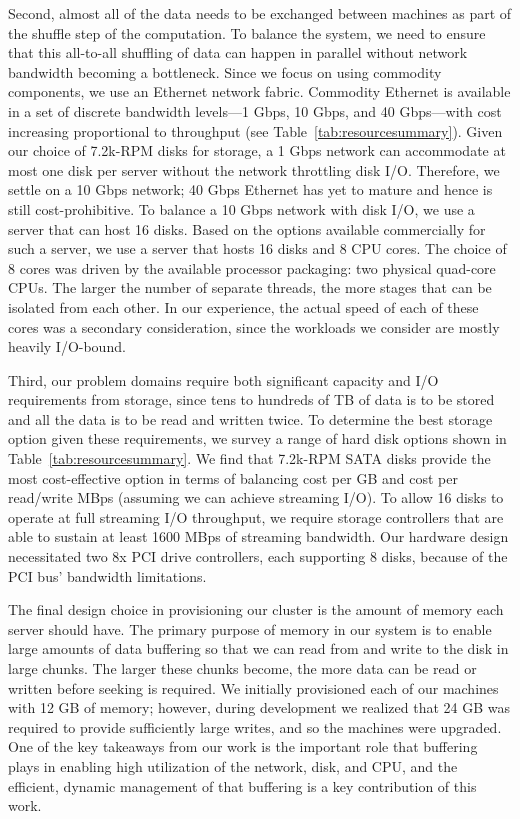 Second, almost all of the data needs to be exchanged between machines as part
of the shuffle step of the computation.  To balance the system, we need to
ensure that this all-to-all shuffling of data can happen in parallel without
network bandwidth becoming a bottleneck.  Since we focus on using commodity
components, we use an Ethernet network fabric.  Commodity Ethernet is available
in a set of discrete bandwidth levels---1 Gbps, 10 Gbps, and 40 Gbps---with
cost increasing proportional to throughput (see
Table~\ref{tab:resourcesummary}).  Given our choice of 7.2k-RPM disks for
storage, a 1 Gbps network can accommodate at most one disk per server without
the network throttling disk I/O.  Therefore, we settle on a 10 Gbps network; 40
Gbps Ethernet has yet to mature and hence is still cost-prohibitive.  To
balance a 10 Gbps network with disk I/O, we use a server that can host 16
disks.  Based on the options available commercially for such a server, we use a
server that hosts 16 disks and 8 CPU cores.  The choice of 8 cores was driven
by the available processor packaging: two physical quad-core CPUs.  The larger
the number of separate threads, the more stages that can be isolated from each
other.  In our experience, the actual speed of each of these cores was a
secondary consideration, since the workloads we consider are mostly heavily
I/O-bound.

Third, our problem domains require both significant capacity and I/O
requirements from storage, since tens to hundreds of TB of data is to be stored
and all the data is to be read and written twice.  To determine the best
storage option given these requirements, we survey a range of hard disk options
shown in Table~\ref{tab:resourcesummary}.  We find that 7.2k-RPM SATA disks
provide the most cost-effective option in terms of balancing cost per GB and
cost per read/write MBps (assuming we can achieve streaming I/O).  To allow 16
disks to operate at full streaming I/O throughput, we require storage
controllers that are able to sustain at least 1600 MBps of streaming bandwidth.
Our hardware design necessitated two 8x PCI drive controllers, each supporting
8 disks, because of the PCI bus' bandwidth limitations.

The final design choice in provisioning our cluster is the amount of memory
each server should have.  The primary purpose of memory in our system is to
enable large amounts of data buffering so that we can read from and write to
the disk in large chunks.  The larger these chunks become, the more data can be
read or written before seeking is required.  We initially provisioned each of
our machines with 12 GB of memory; however, during development we realized that
24 GB was required to provide sufficiently large writes, and so the machines
were upgraded.  One of the key takeaways from our work is the important role
that buffering plays in enabling high utilization of the network, disk, and
CPU, and the efficient, dynamic management of that buffering is a key
contribution of this work.


